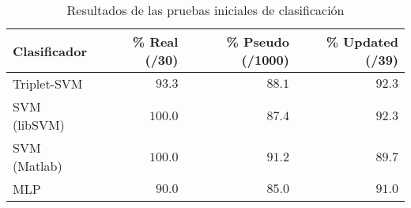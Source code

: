 \begin{table}
  \caption{Resultados de las pruebas iniciales de clasificación}
  \center%
  \begin{tabular}{lrrr}\toprule
    Clasificador  & \% Real (/30) &
                     \% Pseudo (/1000) & \% Updated (/39) \\\midrule
    Triplet-SVM   &  $93.3$    & $88.1$     & $92.3$     \\
    SVM (libSVM)  & $100.0$    & $87.4$     & $92.3$     \\
    SVM (Matlab)  & $100.0$    & $91.2$     & $89.7$     \\
    MLP           &  $90.0$    & $85.0$     & $91.0$  \\\bottomrule
  \end{tabular}
  \label{testresults}

\end{table}